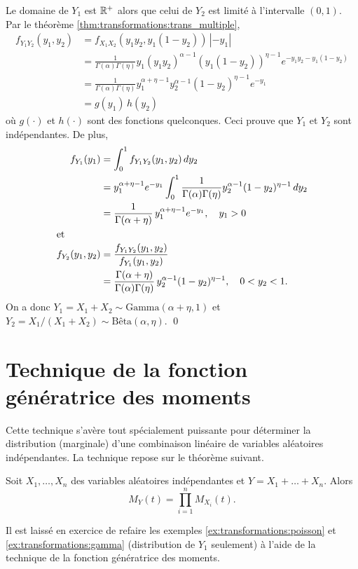 \begin{exemple}
  Le domaine de $Y_1$ est $\mathbb{R}^+$ alors que celui de $Y_2$ est limité à
  l'intervalle $(0, 1)$. Par le théorème
  \ref{thm:transformations:trans_multiple},
  \begin{align*}
    f_{Y_1 Y_2}(y_1, y_2)
    &= f_{X_1 X_2}(y_1 y_2, y_1(1-y_2))\, |-y_1| \\
    &= \frac{1}{\Gamma(\alpha) \Gamma(\eta)}
    y_1 (y_1 y_2)^{\alpha - 1} (y_1 (1 - y_2))^{\eta - 1} e^{-y_1 y_2
      - y_1(1 - y_2)} \\
    &=  \frac{1}{\Gamma(\alpha) \Gamma(\eta)}
    y_1^{\alpha + \eta - 1} y_2^{\alpha - 1} (1 - y_2)^{\eta - 1}
    e^{-y_1} \\
    &= g(y_1)\, h(y_2)
  \end{align*}
  où $g(\cdot)$ et $h(\cdot)$ sont des fonctions quelconques. Ceci
  prouve que $Y_1$ et $Y_2$ sont indépendantes. De plus,
  \begin{align*}
    f_{Y_1}(y_1)
    &= \int_0^1 f_{Y_1 Y_2}(y_1, y_2)\, dy_2 \\
    &= y_1^{\alpha + \eta - 1} e^{-y_1}
    \int_0^1 \frac{1}{\Gamma(\alpha) \Gamma(\eta)}
    y_2^{\alpha - 1} (1 - y_2)^{\eta - 1}\, dy_2 \\
    &= \frac{1}{\Gamma(\alpha + \eta)}\, y_1^{\alpha + \eta - 1}
    e^{-y_1}, \quad y_1 > 0 \\
    \intertext{et}
    f_{Y_2}(y_1, y_2)
    &= \frac{f_{Y_1 Y_2}(y_1, y_2)}{f_{Y_1}(y_1, y_2)} \\
    &= \frac{\Gamma(\alpha + \eta)}{\Gamma(\alpha) \Gamma(\eta)}\,
    y_2^{\alpha - 1} (1 - y_2)^{\eta - 1}, \quad
    0 < y_2 < 1.
  \end{align*}
  On a donc $Y_1 = X_1 + X_2 \sim \text{Gamma}(\alpha + \eta, 1)$ et
  $Y_2 = X_1/(X_1 + X_2) \sim \text{Bêta}(\alpha, \eta)$. %
  \qed
\end{exemple}


\section{Technique de la fonction génératrice des moments}

Cette technique s'avère tout spécialement puissante pour déterminer la
distribution (marginale) d'une combinaison linéaire de variables
aléatoires indépendantes. La technique repose sur le théorème
suivant.

\begin{thm}
  Soit $X_1, \dots, X_n$ des variables aléatoires indépendantes et $Y
  = X_1 + \dots + X_n$. Alors
  \begin{displaymath}
    M_Y(t) = \prod_{i=1}^n M_{X_i}(t).
  \end{displaymath}
\end{thm}

Il est laissé en exercice de refaire les exemples
\ref{ex:transformations:poisson} et \ref{ex:transformations:gamma}
(distribution de $Y_1$ seulement) à l'aide de la technique de la
fonction génératrice des moments.

